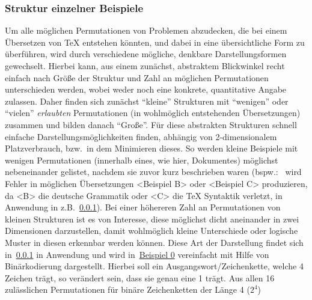 \subsubsection{Struktur einzelner Beispiele}
Um alle möglichen Permutationen von Problemen abzudecken, die bei einem Übersetzen von \TeX{} entstehen könnten, und dabei in eine übersichtliche Form zu überführen, wird durch verschiedene mögliche, denkbare Darstellungsformen gewechselt. Hierbei kann, aus einem zunächst, abstraktem Blickwinkel recht einfach nach Größe der Struktur und Zahl an möglichen Permutationen unterschieden werden, wobei weder noch eine konkrete, quantitative Angabe zulassen. Daher finden sich zunächst \enquote{kleine} Strukturen mit \enquote{wenigen} oder \enquote{vielen} \textit{erlaubten} Permutationen (in wohlmöglich entstehenden Übersetzungen) zusammen und bilden danach \enquote{Große}.%
Für diese abstrakten Strukturen schnell einfache Darstellungsmöglichkeiten finden, abhängig von 2-dimensionalem Platzverbrauch, bzw.\ in dem Minimieren dieses. So werden kleine Beispiele mit wenigen Permutationen (innerhalb eines, wie hier, Dokumentes) möglichst nebeneinander gelistet, nachdem sie zuvor kurz beschrieben waren
(bspw.:\ <Beispiel A> wird Fehler in möglichen Übersetzungen <Beispiel B> oder <Beispiel C> produzieren, da <B> die deutsche Grammatik oder <C> die \TeX{} Syntaktik verletzt, in Anwendung in z.B.~\ref{}).
Bei einer höhereren Zahl an Permutationen von kleinen Strukturen ist es von Interesse, diese möglichst dicht aneinander in zwei Dimensionen darzustellen, damit wohlmöglich kleine Unterschiede oder logische Muster in diesen erkennbar werden können. Diese Art der Darstellung findet sich in~\ref{} in Anwendung und wird in~\hyperref[tab:problems:exampleExample]{Beispiel 0} vereinfacht mit Hilfe von Binärkodierung dargestellt. Hierbei soll ein Ausgangswort/Zeichenkette, welche 4 Zeichen trägt, so verändert sein, dass sie genau eine 1 trägt. Aus allen 16 zulässlichen Permutationen für binäre Zeichenketten der Länge 4 ($2^4$)%

